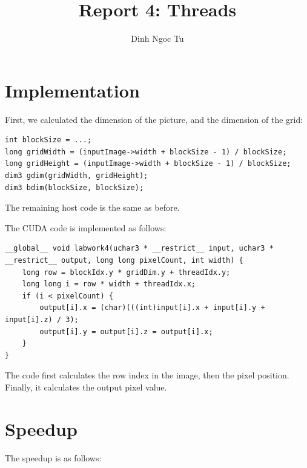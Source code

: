 \documentclass[12pt]{article}
\title{Report 4: Threads}
\author{Dinh Ngoc Tu}
\begin{document}
\maketitle


\section{Implementation}

First, we calculated the dimension of the picture, and the dimension of the grid:

\begin{lstlisting}[breaklines]
int blockSize = ...;
long gridWidth = (inputImage->width + blockSize - 1) / blockSize;
long gridHeight = (inputImage->width + blockSize - 1) / blockSize;
dim3 gdim(gridWidth, gridHeight);
dim3 bdim(blockSize, blockSize);
\end{lstlisting}

The remaining host code is the same as before.

The CUDA code is implemented as follows:

\begin{lstlisting}[breaklines]
__global__ void labwork4(uchar3 * __restrict__ input, uchar3 * __restrict__ output, long long pixelCount, int width) {
    long row = blockIdx.y * gridDim.y + threadIdx.y;
    long long i = row * width + threadIdx.x;
    if (i < pixelCount) {
        output[i].x = (char)(((int)input[i].x + input[i].y + input[i].z) / 3);
        output[i].y = output[i].z = output[i].x;
    }
}
\end{lstlisting}

The code first calculates the row index in the image, then the pixel position. Finally, it calculates the output pixel value.


\section{Speedup}

The speedup is as follows:
\end{document}
